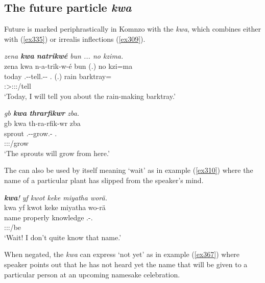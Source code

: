 \subsection{The future particle \emph{kwa}}\label{futurekwa}

Future is marked periphrastically in Komnzo with the  \emph{kwa}, which combines either with  (\ref{ex335}) or irrealis inflections (\ref{ex309}).

\begin{exe}
 	\ex \emph{zena \textbf{kwa} \textbf{natrikwé} bun ... no kzima.}\\
 	\glll zena kwa n-a-trik-w-é bun (.) no kzi=ma\\
 	today \Fut{} \Ssg.\Alph-\Vc-tell.\Ext-\Ndu-\Fsg{} \Ssg.\Dat{} (.) rain barktray=\Char{}\\
	{} {} \footnotesize{\Fsg:\Sbj>\Ssg:\Io:\Nonpast:\Ipfv/tell} {} {} {}\\
 	\trans `Today, I will tell you about the rain-making barktray.' 
 	\label{ex335}
\end{exe}
\begin{exe}
 	\ex \emph{gb \textbf{kwa} \textbf{thrarfikwr} zba.}\\
 	\glll gb kwa th-ra-rfik-wr zba\\
 	sprout \Fut{} \Stnsg.\Bet-\Irr-grow.\Ext-\Ndu{} \Prox.\Abl\\
	{} {} \footnotesize{\Stpl:\Sbj:\Irr:\Ipfv/grow} {}\\
 	\trans `The sprouts will grow from here.' 
 	\label{ex309}
\end{exe}

The   can also be used by itself meaning `wait' as in example (\ref{ex310}) where the name of a particular plant has slipped from the speaker's mind.

\begin{exe}
	\ex \emph{\textbf{kwa}! yf kwot keke miyatha worä.}\\
	\glll kwa yf kwot keke miyatha wo-rä\\
	\Fut{} name properly \Neg{} knowledge \Fsg.\Alph-\Cop.\Ndu\\
	{} {} {} {} {} \footnotesize{\Fsg:\Sbj:\Nonpast:\Ipfv/be}\\
	\trans `Wait! I don't quite know that name.' 
	\label{ex310}
\end{exe}

When negated, the   \emph{kwa} can express `not yet' as in example (\ref{ex367}) where speaker points out that he has not heard yet the name that will be given to a particular person at an upcoming namesake celebration.


